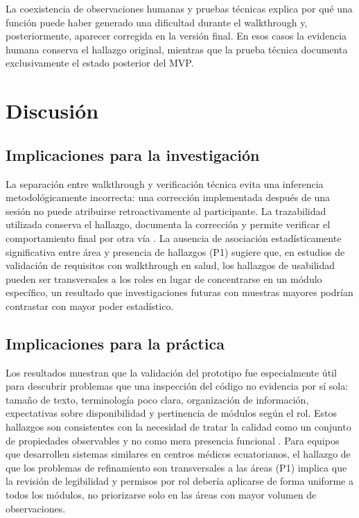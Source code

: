 \documentclass[runningheads]{llncs}
\begin{document}
	La coexistencia de observaciones humanas y pruebas técnicas explica por qué una función puede haber generado una dificultad durante el walkthrough y, posteriormente, aparecer corregida en la versión final. En esos casos la evidencia humana conserva el hallazgo original, mientras que la prueba técnica documenta exclusivamente el estado posterior del MVP.
	
	\section{Discusión}
	\subsection{Implicaciones para la investigación}
	La separación entre walkthrough y verificación técnica evita una inferencia metodológicamente incorrecta: una corrección implementada después de una sesión no puede atribuirse retroactivamente al participante. La trazabilidad utilizada conserva el hallazgo, documenta la corrección y permite verificar el comportamiento final por otra vía \cite{gotel1994,ramesh2001}. La ausencia de asociación estadísticamente significativa entre área y presencia de hallazgos (P1) sugiere que, en estudios de validación de requisitos con walkthrough en salud, los hallazgos de usabilidad pueden ser transversales a los roles en lugar de concentrarse en un módulo específico, un resultado que investigaciones futuras con muestras mayores podrían contrastar con mayor poder estadístico.
	
	\subsection{Implicaciones para la práctica}
	Los resultados muestran que la validación del prototipo fue especialmente útil para descubrir problemas que una inspección del código no evidencia por sí sola: tamaño de texto, terminología poco clara, organización de información, expectativas sobre disponibilidad y pertinencia de módulos según el rol. Estos hallazgos son consistentes con la necesidad de tratar la calidad como un conjunto de propiedades observables y no como mera presencia funcional \cite{iso25010}. Para equipos que desarrollen sistemas similares en centros médicos ecuatorianos, el hallazgo de que los problemas de refinamiento son transversales a las áreas (P1) implica que la revisión de legibilidad y permisos por rol debería aplicarse de forma uniforme a todos los módulos, no priorizarse solo en las áreas con mayor volumen de observaciones.
	
\end{document}

